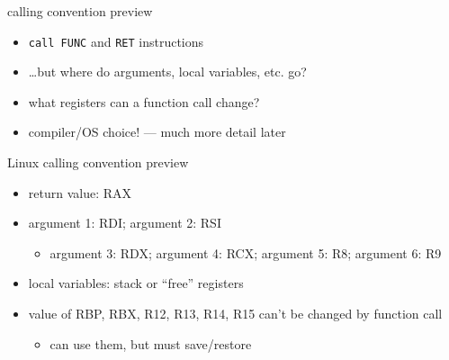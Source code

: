 \begin{frame}{calling convention preview}
    \begin{itemize}
    \item \texttt{call FUNC} and \texttt{RET} instructions
    \item \ldots but where do arguments, local variables, etc. go?
    \item what registers can a function call change?
    \item compiler/OS choice! --- much more detail later
    \end{itemize}
\end{frame}
\begin{frame}{Linux calling convention preview}
        \begin{itemize}
        \item return value: RAX
        \item argument 1: RDI; argument 2: RSI
            \begin{itemize}
            \item argument 3: RDX; argument 4: RCX; argument 5: R8; argument 6: R9
            \end{itemize}
        \item local variables: stack or ``free'' registers
        \item value of RBP, RBX, R12, R13, R14, R15 can't be changed by function call
            \begin{itemize}
            \item can use them, but must save/restore
            \end{itemize}
        \end{itemize}
\end{frame}

